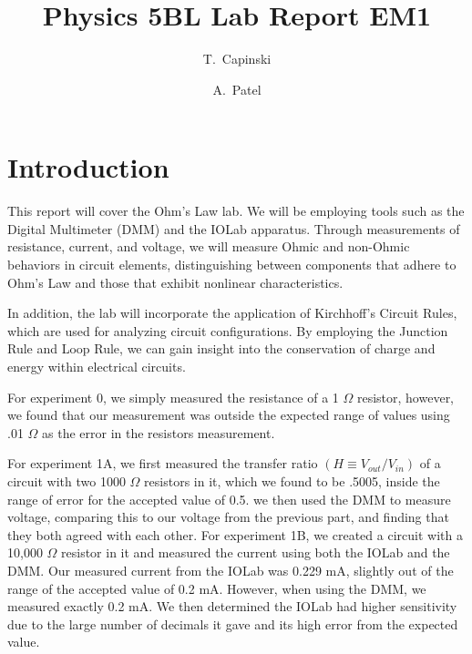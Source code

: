 \documentclass[11pt]{article}
\title{Physics 5BL Lab Report EM1}
\author{T.~Capinski \and A.~Patel}
\let\oldsection\section
\renewcommand\section{\clearpage\oldsection}
\begin{document}
    \maketitle
    \tableofcontents

    \section*{Introduction}\label{sec:introduction}

    This report will cover the Ohm's Law lab.
    We will be employing tools such as the Digital Multimeter (DMM) and the IOLab apparatus.
    Through measurements of resistance, current, and voltage, we will measure Ohmic and non-Ohmic behaviors in circuit elements, distinguishing between components that adhere to Ohm's Law and those that exhibit nonlinear characteristics.

    In addition, the lab will incorporate the application of Kirchhoff's Circuit Rules, which are used for analyzing circuit configurations.
    By employing the Junction Rule and Loop Rule, we can gain insight into the conservation of charge and energy within electrical circuits.

    For experiment 0, we simply measured the resistance of a 1 $\Omega$ resistor, however, we found that our measurement was outside the expected range of values using .01 $\Omega$ as the error in the resistors measurement. 

    For experiment 1A, we first measured the transfer ratio $(H \equiv V_{out} /V_{in})$ of a circuit with two 1000 $\Omega$ resistors in it, which we found to be .5005, inside the range of error for the accepted value of 0.5. we then used the DMM to measure voltage, comparing this to our voltage from the previous part, and finding that they both agreed with each other.
    For experiment 1B, we created a circuit with a 10,000 $\Omega$ resistor in it and measured the current using both the IOLab and the DMM. Our measured current from the IOLab was 0.229 mA, slightly out of the range of the accepted value of 0.2 mA. However, when using the DMM, we measured exactly 0.2 mA. We then determined the IOLab had higher sensitivity due to the large number of decimals it gave and its high error from the expected value.
\end{document}
